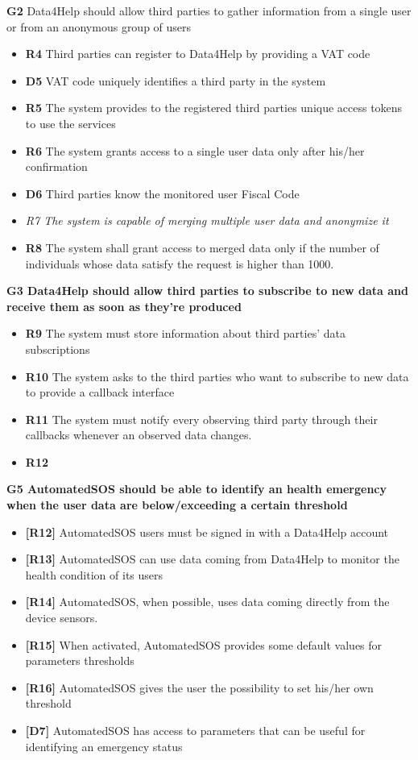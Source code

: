 \item \textbf{G2} Data4Help should allow third parties to gather information from a single user or from an anonymous group of users
\begin{itemize}
\item \textbf{R4} Third parties can register to Data4Help by providing a VAT code
\item \textbf{D5} VAT code uniquely identifies a third party in the system
\item \textbf{R5} The system provides to the registered third parties unique access tokens to use the services
\item \textbf{R6} The system grants access to a single user data only after his/her confirmation
\item \textbf{D6} Third parties know the monitored user Fiscal Code
\item \textit{R7 The system is capable of merging multiple user data and anonymize it}
\item \textbf{R8} The system shall grant access to merged data only if the number	of individuals	whose data satisfy the request is higher than	 1000.	
\end{itemize}

\textbf{G3 Data4Help should allow third parties to subscribe to new data and receive them as soon as they're produced}
\begin{itemize}
\item \textbf{R9} The system must store information about third parties' data subscriptions
\item \textbf{R10} The system asks to the third parties who want to subscribe to new data to provide a callback interface
\item \textbf{R11} The system must notify every observing third party through their callbacks whenever an observed data changes. 
\item \textbf{R12}
\end{itemize}

\textbf{G5 AutomatedSOS should be able to identify an health emergency when the user data are below/exceeding a certain threshold}
\begin{itemize}
\item \textbf{[R12]} AutomatedSOS users must be signed in with a Data4Help account
\item \textbf{[R13]} AutomatedSOS can use data coming from Data4Help to monitor the health condition of its users
\item \textbf{[R14]} AutomatedSOS, when possible, uses data coming directly from the device sensors.
\item \textbf{[R15]} When activated, AutomatedSOS provides some default values for parameters thresholds
\item \textbf{[R16]} AutomatedSOS gives the user the possibility to set his/her own threshold 
\item \textbf{[D7]} AutomatedSOS has access to parameters that can be useful for identifying an emergency status
\end{itemize}

